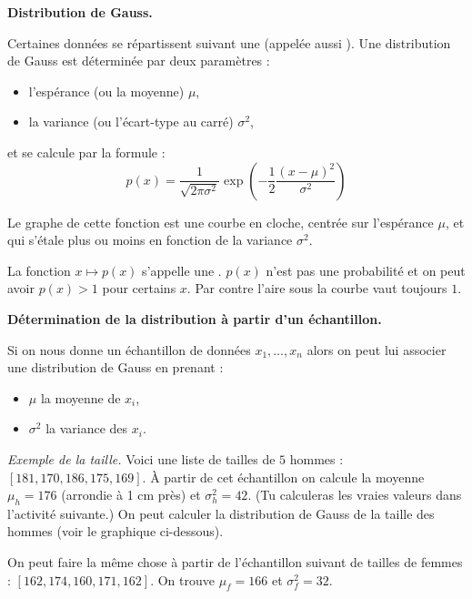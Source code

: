 \documentclass[11pt,class=report,crop=false]{standalone}
\begin{document}
\begin{cours}

\textbf{Distribution de Gauss.}
	
Certaines données se répartissent suivant une  (appelée aussi ).
Une distribution de Gauss est déterminée par deux paramètres :
\begin{itemize}
	\item l'espérance (ou la moyenne) $\mu$,
	\item la variance (ou l’écart-type au carré) $\sigma^2$,
\end{itemize}
et se calcule par la formule :
$$p(x) = \frac{1}{\sqrt{2\pi\sigma^2}} \exp\left( -\frac12 \frac{(x-\mu)^2}{\sigma^2} \right)$$

Le graphe de cette fonction est une courbe en cloche, centrée sur l'espérance $\mu$, et qui s'étale plus ou moins en fonction de la variance $\sigma^2$.



La fonction $x \mapsto p(x)$ s'appelle une . $p(x)$ n'est pas une probabilité et on peut avoir $p(x)>1$ pour certains $x$. Par contre l'aire sous la courbe vaut toujours $1$.

\bigskip

\textbf{Détermination de la distribution à partir d'un échantillon.}

Si on nous donne un échantillon de données $x_1,\ldots,x_n$ alors on peut lui associer une distribution de Gauss en prenant :
\begin{itemize}
	\item $\mu$ la moyenne de $x_i$,
	\item $\sigma^2$ la variance des $x_i$.
\end{itemize}

\medskip

\emph{Exemple de la taille.}
Voici une liste de tailles de $5$ hommes : $[181,170,186,175,169]$.
\`A partir de cet échantillon on calcule la moyenne $\mu_h = 176$ (arrondie à 1 cm près)
et $\sigma^2_h = 42$. (Tu calculeras les vraies valeurs dans l'activité suivante.)
On peut calculer la distribution de Gauss de la taille des hommes (voir le graphique ci-dessous).

On peut faire la même chose à partir de l'échantillon suivant de tailles de femmes : $[162,174,160,171,162]$. On trouve $\mu_f = 166$ et $\sigma^2_f = 32$.   


\end{cours}
\end{document}

